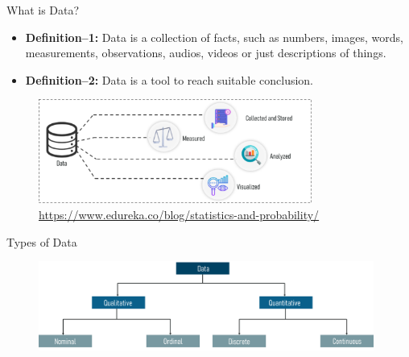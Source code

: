 \documentclass[10pt,dvipsnames, aspectratio=169]{beamer}
\begin{document}
	\begin{frame}[t]{What is Data?}
		\begin{itemize}
			\item \textbf{Definition--1:} Data is a collection of facts, such 
			as 
			numbers, 
			images, words, 
			measurements, observations, audios, videos or just descriptions of 
			things.
			\item \textbf{Definition--2:} Data is a tool to reach suitable 
			conclusion. 
		\end{itemize}
		
		\begin{figure} [ht]
			\centering
			\includegraphics[width=0.8\textwidth]{stats_img/data.png}
			\caption{\url{https://www.edureka.co/blog/statistics-and-probability/}}
		\end{figure}
	\end{frame}
	\begin{frame}[t]{Types of Data}
		\begin{figure} [ht] \vspace{20pt}
			\centering
			\includegraphics[width=0.98\textwidth]{stats_img/types_of_data.png}
		\end{figure}
	\end{frame}
	
\end{document}
